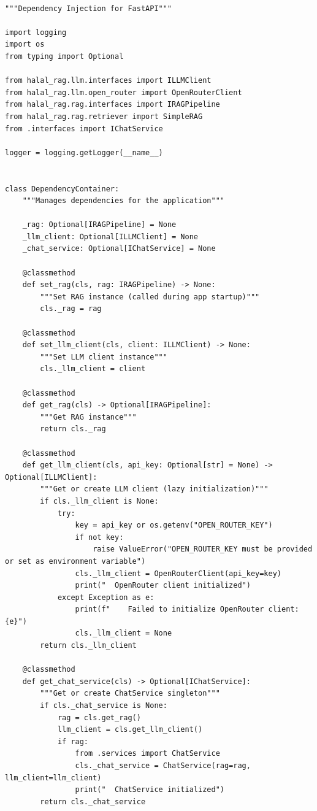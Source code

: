 \begin{lstlisting}[basicstyle=\tiny\ttfamily,breaklines=true]

"""Dependency Injection for FastAPI"""

import logging
import os
from typing import Optional

from halal_rag.llm.interfaces import ILLMClient
from halal_rag.llm.open_router import OpenRouterClient
from halal_rag.rag.interfaces import IRAGPipeline
from halal_rag.rag.retriever import SimpleRAG
from .interfaces import IChatService

logger = logging.getLogger(__name__)


class DependencyContainer:
    """Manages dependencies for the application"""

    _rag: Optional[IRAGPipeline] = None
    _llm_client: Optional[ILLMClient] = None
    _chat_service: Optional[IChatService] = None

    @classmethod
    def set_rag(cls, rag: IRAGPipeline) -> None:
        """Set RAG instance (called during app startup)"""
        cls._rag = rag

    @classmethod
    def set_llm_client(cls, client: ILLMClient) -> None:
        """Set LLM client instance"""
        cls._llm_client = client

    @classmethod
    def get_rag(cls) -> Optional[IRAGPipeline]:
        """Get RAG instance"""
        return cls._rag

    @classmethod
    def get_llm_client(cls, api_key: Optional[str] = None) -> Optional[ILLMClient]:
        """Get or create LLM client (lazy initialization)"""
        if cls._llm_client is None:
            try:
                key = api_key or os.getenv("OPEN_ROUTER_KEY")
                if not key:
                    raise ValueError("OPEN_ROUTER_KEY must be provided or set as environment variable")
                cls._llm_client = OpenRouterClient(api_key=key)
                print("  OpenRouter client initialized")
            except Exception as e:
                print(f"    Failed to initialize OpenRouter client: {e}")
                cls._llm_client = None
        return cls._llm_client

    @classmethod
    def get_chat_service(cls) -> Optional[IChatService]:
        """Get or create ChatService singleton"""
        if cls._chat_service is None:
            rag = cls.get_rag()
            llm_client = cls.get_llm_client()
            if rag:
                from .services import ChatService
                cls._chat_service = ChatService(rag=rag, llm_client=llm_client)
                print("  ChatService initialized")
        return cls._chat_service



\end{lstlisting}
